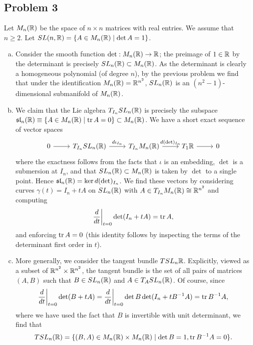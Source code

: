 \documentclass{../mathnotes}
\begin{document}
\subsection*{Problem 3}
Let $M_n(\mathbb{R})$ be the space of $n\times n$ matrices with real entries. We assume that $n\geq 2$.
Let $SL(n,\mathbb{R})=\{A\in M_n(\mathbb{R})\mid\det A=1\}$.
\begin{enumerate}[(a)]
    \item Consider the smooth function $\det:M_n(\mathbb{R})\to\mathbb{R}$; the preimage of $1\in\mathbb{R}$ by the determinant
        is precisely $SL_n(\mathbb{R})\subset M_n(\mathbb{R})$. As the determinant is clearly a homogeneous polynomial
        (of degree $n$), by the previous problem we find that under the identification $M_n(\mathbb{R})=\mathbb{R}^{n^2}$,
        $SL_n(\mathbb{R})$ is an $(n^2-1)$-dimensional submanifold of $M_n(\mathbb{R})$.
    \item We claim that the Lie algebra $T_{I_n}SL_n(\mathbb{R})$ is precisely the subspace
        $\mathfrak{sl}_n(\mathbb{R})\equiv\{A\in M_n(\mathbb{R})\mid \operatorname{tr} A=0\}\subset M_n(\mathbb{R})$. We have a short exact sequence
        of vector spaces
        \begin{equation*}
            \begin{tikzcd}
                0\ar{r} & T_{I_n}SL_n(\R)\ar{r}{d\iota_{I_n}} & T_{I_n}M_n(\R)\ar{r}{d(\det)_{I_n}} & T_1\R\ar{r} & 0
            \end{tikzcd}
        \end{equation*}
        where the exactness follows from the facts that $\iota$ is an embedding, $\det$ is a submersion at $I_n$, and
        that $SL_n(\mathbb{R})\subset M_n(\mathbb{R})$ is taken by $\det$ to a single point. Hence $\mathfrak{sl}_n(\mathbb{R})=\ker d(\det)_{I_n}$.
        We find these vectors by considering curves $\gamma(t)=I_n+tA$ on $SL_n(\mathbb{R})$ with $A\in T_{I_n}M_n(\mathbb{R})\cong\mathbb{R}^{n^2}$
        and computing
        \[\frac{d}{dt}\bigg|_{t=0}\det(I_n+tA)=\operatorname{tr} A,\]
        and enforcing $\operatorname{tr} A=0$ (this identity follows by inspecting the terms of the determinant first order in $t$).
    \item More generally, we consider the tangent bundle $TSL_n\mathbb{R}$. Explicitly, viewed as a subset of $\mathbb{R}^{n^2}\times\mathbb{R}^{n^2}$,
        the tangent bundle is the set of all pairs of matrices $(A,B)$ such that $B\in SL_n(\mathbb{R})$ and $A\in T_ASL_n(\mathbb{R})$.
        Of course, since
        \[\frac{d}{dt}\bigg|_{t=0}\det(B+tA)= \frac{d}{dt}\bigg|_{t=0}\det B\det(I_n+tB^{-1}A)=\operatorname{tr} B^{-1}A,\]
        where we have used the fact that $B$ is invertible with unit determinant, we find that
        \[TSL_n(\mathbb{R})=\{(B,A)\in M_n(\mathbb{R})\times M_n(\mathbb{R})\mid \det B=1, \operatorname{tr} B^{-1}A=0\}.\]
\end{enumerate}
\end{document}
